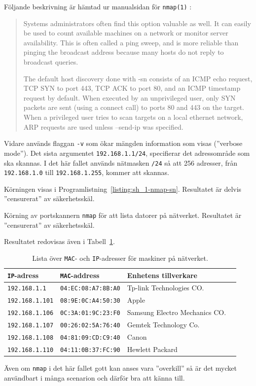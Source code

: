 Följande beskrivning är hämtad ur manualsidan för \texttt{nmap(1)}
\cite{manpage:nmap}:

\begin{quotation}
Systems administrators often find this option valuable as well. It can easily
be used to count available machines on a network or monitor server
availability. This is often called a ping sweep, and is more reliable than
pinging the broadcast address because many hosts do not reply to broadcast
queries.

The default host discovery done with -sn consists of an ICMP echo request, TCP
SYN to port 443, TCP ACK to port 80, and an ICMP timestamp request by default.
When executed by an unprivileged user, only SYN packets are sent (using a
connect call) to ports 80 and 443 on the target. When a privileged user tries
to scan targets on a local ethernet network, ARP requests are used unless
--send-ip was specified.
\end{quotation}

Vidare används flaggan \texttt{-v} som ökar mängden information som visas
(''verbose mode''). Det sista argumentet \texttt{192.168.1.1/24}, specifierar
det adressområde som ska skannas. I det här fallet används nätmasken
\texttt{/24} så att 256 adresser, från \texttt{192.168.1.0} till
\texttt{192.168.1.255}, kommer att skannas.

Körningen visas i Programlistning~\ref{listing:sh_1-nmap-sn}.
Resultatet är delvis ''censurerat'' av säkerhetsskäl.

\begin{listing}[H]
  \caption{Körning av portskannern \texttt{nmap} för att lista datorer på
           nätverket. Resultatet är ''censurerat'' av säkerhetsskäl.}
  \label{listing:sh_1-nmap-sn}
\end{listing}

Resultatet redovisas även i Tabell~\ref{table:network}.

\begin{table}[]
  \centering
  \caption{Lista över \texttt{MAC}- och \texttt{IP}-adresser för maskiner på
           nätverket.}
  \label{table:network}
  \begin{tabular}{@{}llll@{}}
    \toprule
    \texttt{IP}-adress     & \texttt{MAC}-address       & Enhetens tillverkare          \\ \midrule
    \texttt{192.168.1.1}   & \texttt{04:EC:08:A7:8B:A0} & Tp-link Technologies CO.      \\
    \texttt{192.168.1.101} & \texttt{08:9E:0C:A4:50:30} & Apple                         \\
    \texttt{192.168.1.106} & \texttt{0C:3A:01:9C:23:F0} & Samsung Electro Mechanics CO. \\
    \texttt{192.168.1.107} & \texttt{00:26:02:5A:76:40} & Gemtek Technology Co.         \\
    \texttt{192.168.1.108} & \texttt{04:81:09:CD:C9:40} & Canon                         \\
    \texttt{192.168.1.110} & \texttt{04:11:0B:37:FC:90} & Hewlett Packard               \\ \bottomrule
  \end{tabular}
\end{table}


Även om \texttt{nmap} i det här fallet gott kan anses vara ''overkill'' så är
det mycket användbart i många scenarion och därför bra att känna till.

